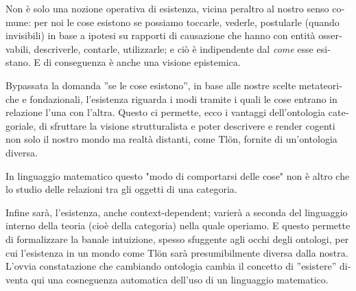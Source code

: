 \documentclass{amsart}
\begin{document}
\begin{italian}
 	Non è solo una nozione operativa di esistenza, vicina peraltro al nostro senso comune: per noi le cose esistono se possiamo toccarle, vederle, postularle (quando invisibili) in base a ipotesi su rapporti di causazione che hanno con entità osservabili, descriverle, contarle, utilizzarle; e ciò è indipendente dal \emph{come} esse esistano. E di conseguenza è anche una visione epistemica. 
 	
 	Bypassata la domanda ''se le cose esistono'', in base alle nostre scelte metateoriche e fondazionali, l'esistenza riguarda i modi tramite i quali le cose entrano in relazione l'una con l'altra. Questo ci permette, ecco i vantaggi dell'ontologia categoriale, di sfruttare la visione strutturalista e poter descrivere e render cogenti non solo il nostro mondo ma realtà distanti, come Tl\"on, fornite di un'ontologia diversa. 
 	
 	In linguaggio matematico questo "modo di comportarsi delle cose" non è altro che lo studio delle relazioni tra gli oggetti di una categoria.
 	
 	Infine sarà, l'esistenza, anche context-dependent; varierà a seconda del linguaggio interno della teoria (cioè della categoria) nella quale operiamo. E questo permette di formalizzare la banale intuizione, spesso sfuggente agli occhi degli ontologi, per cui l'esistenza in un mondo come Tl\"on sarà presumibilmente diversa dalla nostra. L'ovvia constatazione che cambiando ontologia cambia il concetto di ''esistere'' diventa qui una cosneguenza automatica dell'uso di un linguaggio matematico. 
 \end{italian}
\end{document}
